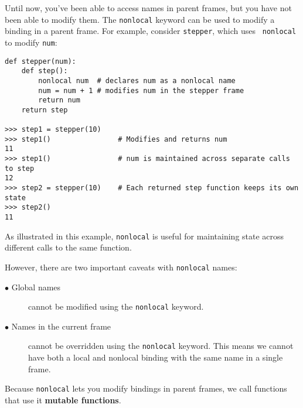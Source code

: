 Until now, you've been able to access names in parent frames, but you have not
been able to modify them. The {\tt nonlocal} keyword can be used to modify a
binding in a parent frame. For example, consider {\tt stepper}, which uses {\tt
nonlocal} to modify {\tt num}:

\begin{lstlisting}
def stepper(num):
    def step():
        nonlocal num  # declares num as a nonlocal name
        num = num + 1 # modifies num in the stepper frame
        return num
    return step

>>> step1 = stepper(10)
>>> step1()                # Modifies and returns num
11
>>> step1()                # num is maintained across separate calls to step
12
>>> step2 = stepper(10)    # Each returned step function keeps its own state
>>> step2()
11
\end{lstlisting}

As illustrated in this example, \texttt{nonlocal} is useful for maintaining
state across different calls to the same function.

However, there are two important caveats with {\tt nonlocal} names:
\begin{description}
  \item[$\bullet$ Global names] cannot be modified using the {\tt nonlocal}
  keyword.
  \item[$\bullet$ Names in the current frame] cannot be overridden
  using the {\tt nonlocal} keyword. This means we cannot have both a local and
  nonlocal binding with the same name in a single frame.
\end{description}

Because {\tt nonlocal} lets you modify bindings in parent frames, we call
functions that use it \textbf{mutable functions}.
